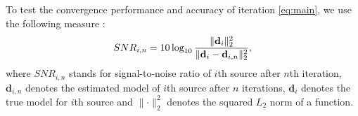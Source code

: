 To test the convergence performance and accuracy of iteration \ref{eq:main}, we use the following measure \cite[]{hennenfent2006}:
\begin{equation}
\label{eq:diff}
SNR_{i,n}=10\log_{10}\frac{\Arrowvert \mathbf{d}_i \Arrowvert_2^2}{\Arrowvert \mathbf{d}_i-\mathbf{d}_{i,n}\Arrowvert_2^2},
\end{equation}
where $SNR_{i,n}$ stands for signal-to-noise ratio of $i$th source after $n$th iteration, $\mathbf{d}_{i,n}$ denotes the estimated model of $i$th source after $n$ iterations, $\mathbf{d}_i$ denotes the true model for $i$th source and $\parallel \cdot \parallel_2^2$ denotes the squared $L_2$ norm of a function.


